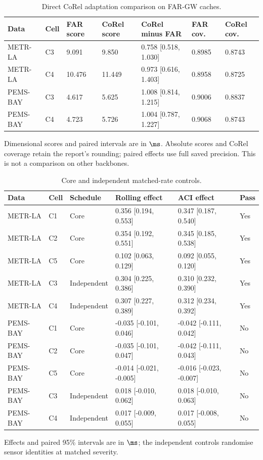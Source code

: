 \begin{table}[p]
\caption{Direct CoRel adaptation comparison on FAR-GW caches.}\label{tab:corel}
\centering\footnotesize
\setlength{\tabcolsep}{4pt}
\begin{tabular}{lllllll}\toprule
Data & Cell & FAR score & CoRel score & CoRel minus FAR & FAR cov. & CoRel cov. \\\midrule
METR-LA & C3 & 9.091 & 9.850 & 0.758 [0.518, 1.030] & 0.8985 & 0.8743 \\
METR-LA & C4 & 10.476 & 11.449 & 0.973 [0.616, 1.403] & 0.8958 & 0.8725 \\
PEMS-BAY & C3 & 4.617 & 5.625 & 1.008 [0.814, 1.215] & 0.9006 & 0.8837 \\
PEMS-BAY & C4 & 4.723 & 5.726 & 1.004 [0.787, 1.227] & 0.9068 & 0.8743 \\
\bottomrule\end{tabular}
\par\smallskip\footnotesize Dimensional scores and paired intervals are in $\ms$. Absolute scores and CoRel coverage retain the report's rounding; paired effects use full saved precision. This is not a comparison on other backbones.
\end{table}\clearpage
\begin{table}[p]
\caption{Core and independent matched-rate controls.}\label{tab:controls}
\centering\small
\begin{tabular}{llllll}\toprule
Data & Cell & Schedule & Rolling effect & ACI effect & Pass \\\midrule
METR-LA & C1 & Core & 0.356 [0.194, 0.553] & 0.347 [0.187, 0.540] & Yes \\
METR-LA & C2 & Core & 0.354 [0.192, 0.551] & 0.345 [0.185, 0.538] & Yes \\
METR-LA & C5 & Core & 0.102 [0.063, 0.129] & 0.092 [0.055, 0.120] & Yes \\
METR-LA & C3 & Independent & 0.304 [0.225, 0.386] & 0.310 [0.232, 0.390] & Yes \\
METR-LA & C4 & Independent & 0.307 [0.227, 0.389] & 0.312 [0.234, 0.392] & Yes \\
PEMS-BAY & C1 & Core & -0.035 [-0.101, 0.046] & -0.042 [-0.111, 0.042] & No \\
PEMS-BAY & C2 & Core & -0.035 [-0.101, 0.047] & -0.042 [-0.111, 0.043] & No \\
PEMS-BAY & C5 & Core & -0.014 [-0.021, -0.005] & -0.016 [-0.023, -0.007] & No \\
PEMS-BAY & C3 & Independent & 0.018 [-0.010, 0.062] & 0.018 [-0.010, 0.063] & No \\
PEMS-BAY & C4 & Independent & 0.017 [-0.009, 0.055] & 0.017 [-0.008, 0.055] & No \\
\bottomrule\end{tabular}
\par\smallskip\footnotesize Effects and paired 95\% intervals are in $\ms$; the independent controls randomise sensor identities at matched severity.
\end{table}\clearpage
